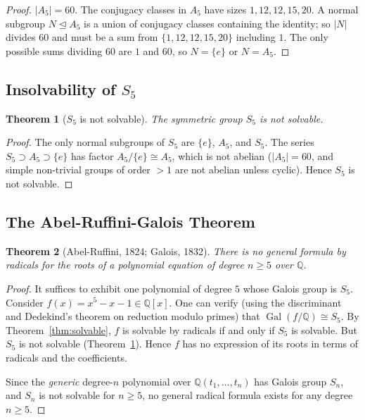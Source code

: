 \documentclass[12pt,a4paper]{amsart}
\newtheorem{theorem}{Theorem}[section]
\theoremstyle{definition}
\newcommand{\Q}{\mathbb{Q}}
\newcommand{\Gal}{\operatorname{Gal}}
\begin{document}
\begin{proof}
$|A_5| = 60$. The conjugacy classes in $A_5$ have sizes
$1, 12, 12, 15, 20$. A normal subgroup $N \trianglelefteq A_5$ is a union of
conjugacy classes containing the identity; so $|N|$ divides $60$ and must be
a sum from $\{1, 12, 12, 15, 20\}$ including $1$. The only possible sums
dividing $60$ are $1$ and $60$, so $N = \{e\}$ or $N = A_5$.
\end{proof}

\subsection{Insolvability of $S_5$}

\begin{theorem}[$S_5$ is not solvable]
\label{thm:s5notsolv}
The symmetric group $S_5$ is not solvable.
\end{theorem}

\begin{proof}
The only normal subgroups of $S_5$ are $\{e\}$, $A_5$, and $S_5$. The series
$S_5 \supset A_5 \supset \{e\}$ has factor $A_5/\{e\} \cong A_5$, which is not
abelian ($|A_5| = 60$, and simple non-trivial groups of order $> 1$ are not
abelian unless cyclic). Hence $S_5$ is not solvable.
\end{proof}

\subsection{The Abel-Ruffini-Galois Theorem}

\begin{theorem}[Abel-Ruffini, 1824; Galois, 1832]
\label{thm:abelruffini}
There is no general formula by radicals for the roots of a polynomial equation
of degree $n \geq 5$ over $\Q$.
\end{theorem}

\begin{proof}
It suffices to exhibit one polynomial of degree $5$ whose Galois group is $S_5$.
Consider $f(x) = x^5 - x - 1 \in \Q[x]$. One can verify (using the
discriminant and Dedekind's theorem on reduction modulo primes) that
$\Gal(f/\Q) \cong S_5$. By Theorem~\ref{thm:solvable}, $f$ is solvable by
radicals if and only if $S_5$ is solvable. But $S_5$ is not solvable
(Theorem~\ref{thm:s5notsolv}). Hence $f$ has no expression of its roots in
terms of radicals and the coefficients.

Since the \emph{generic} degree-$n$ polynomial over $\Q(t_1,\dots,t_n)$ has
Galois group $S_n$, and $S_n$ is not solvable for $n \geq 5$, no general
radical formula exists for any degree $n \geq 5$.
\end{proof}
\end{document}

